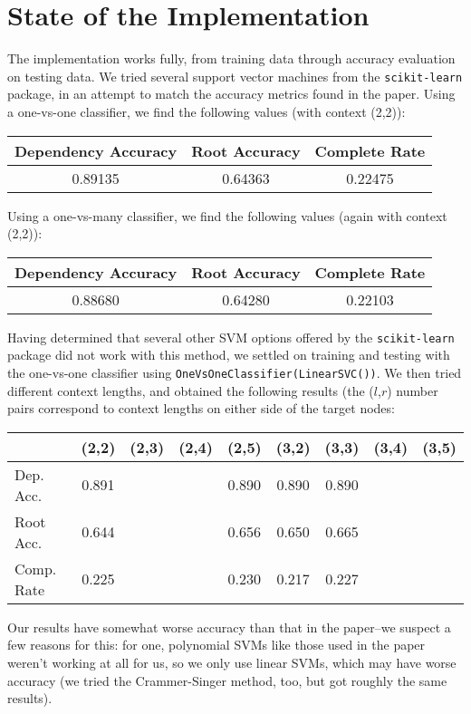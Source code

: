 \documentclass[12pt,fleqn]{article}
\begin{document}
    \section*{State of the Implementation}
    The implementation works fully, from training data through accuracy evaluation on testing data. We tried several support vector machines from the \texttt{scikit-learn} package, in an attempt to match the accuracy metrics found in the paper. Using a one-vs-one classifier, we find the following values (with context (2,2)):
    \begin{center}
        \begin{tabular}{|c|c|c|}
            \hline Dependency Accuracy & Root Accuracy & Complete Rate \\ \hline
            0.89135 & 0.64363 & 0.22475 \\ \hline
        \end{tabular}
    \end{center}
    Using a one-vs-many classifier, we find the following values (again with context (2,2)):
    \begin{center}
        \begin{tabular}{|c|c|c|}
            \hline Dependency Accuracy & Root Accuracy & Complete Rate \\ \hline
            0.88680 & 0.64280 & 0.22103 \\ \hline
        \end{tabular}
    \end{center}
    Having determined that several other SVM options offered by the \texttt{scikit-learn} package did not work with this method, we settled on training and testing with the one-vs-one classifier using \texttt{OneVsOneClassifier(LinearSVC())}. We then tried different context lengths, and obtained the following results (the ($l$,$r$) number pairs correspond to context lengths on either side of the target nodes:
    \begin{center}
        \begin{tabular}{|l|cccc|cccc|}
            \cline{2-9} \multicolumn{1}{c|}{} & (2,2) & (2,3) & (2,4) & (2,5) & (3,2) & (3,3) & (3,4) & (3,5) \\ \hline
            Dep. Acc. & 0.891 &&& 0.890 & 0.890 & 0.890 && \\
            Root Acc. & 0.644 &&& 0.656 & 0.650 & 0.665 && \\
            Comp. Rate & 0.225 &&& 0.230 & 0.217 & 0.227 && \\ \hline
        \end{tabular}
    \end{center}
    Our results have somewhat worse accuracy than that in the paper--we suspect a few reasons for this: for one, polynomial SVMs like those used in the paper weren't working at all for us, so we only use linear SVMs, which may have worse accuracy (we tried the Crammer-Singer method, too, but got roughly the same results).
\end{document}
